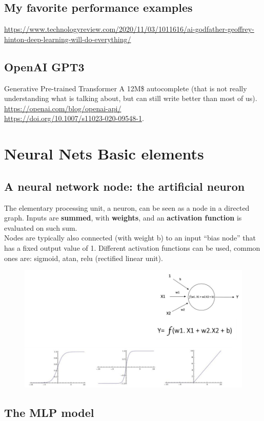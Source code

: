 \subsection{My favorite performance examples}


\url{https://www.technologyreview.com/2020/11/03/1011616/ai-godfather-geoffrey-hinton-deep-learning-will-do-everything/}


\subsection{OpenAI GPT3}

Generative Pre-trained Transformer A 12M\$ autocomplete (that is not really understanding what is talking about, but can still write better than most of us). \url{https://openai.com/blog/openai-api/}\\
\url{https://doi.org/10.1007/s11023-020-09548-1}.
\section{Neural Nets Basic elements}
\subsection{A neural network node: the artificial neuron}
The elementary processing unit, a neuron, can be seen as a node in a directed graph. Inputs are \textbf{summed}, with \textbf{weights}, and an \textbf{activation function} is evaluated on such sum.\\
Nodes are typically also connected (with weight b) to an input “bias node” that has a fixed output value of 1. Different activation functions can be used, common ones are: sigmoid, atan, relu (rectified linear unit).

\begin{figure}[ht]
	\centering
	\includegraphics[width=0.7\linewidth]{figure_ml/neuron.png}
\end{figure}
\FloatBarrier


\subsection{The MLP model}

